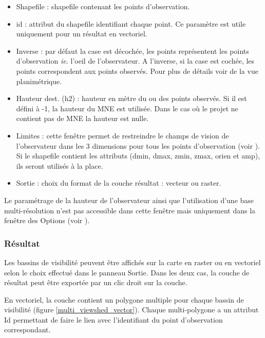 \documentclass{report}
\begin{document}
\begin{itemize}
	\item Shapefile : shapefile contenant les points d'observation.
	\item id : attribut du shapefile identifiant chaque point. Ce paramètre est utile uniquement pour un résultat en vectoriel.
	\item Inverse : par défaut la case est décochée, les points représentent les points d'observation \textit{ie.} l'oeil de l'observateur. A l'inverse, si la case est cochée, les points correspondent aux points observés. Pour plus de détails voir  de la vue planimétrique.
	\item Hauteur dest. (h2) : hauteur en mètre du ou des points observés. Si il est défini à -1, la hauteur du MNE est utilisée. Dans le cas où le projet ne contient pas de MNE la hauteur est nulle.
	\item Limites : cette fenêtre permet de restreindre le champs de vision de l'observateur dans les 3 dimensions pour tous les points d'observation (voir ). Si le shapefile contient les attributs (dmin, dmax, zmin, zmax, orien et amp), ils seront utilisés à la place.
	\item Sortie : choix du format de la couche résultat : vecteur ou raster.
\end{itemize}

Le paramétrage de la hauteur de l'observateur ainsi que l'utilisation d'une base multi-résolution n'est pas accessible dans cette fenêtre mais uniquement dans la fenêtre des Options (voir ).

\subsubsection{Résultat}
Les bassins de visibilité peuvent être affichés sur la carte en raster ou en vectoriel selon le choix effectué dans le panneau Sortie. Dans les deux cas, la couche de résultat peut être exportée par un clic droit sur la couche.

En vectoriel, la couche contient un polygone multiple pour chaque bassin de visibilité (figure \ref{multi_viewshed_vector}). Chaque multi-polygone a un attribut Id permettant de faire le lien avec l'identifiant du point d'observation correspondant.
\end{document}
